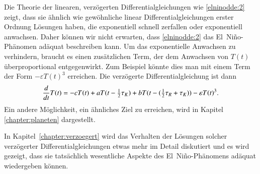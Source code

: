 Die Theorie der linearen, verzögerten Differentialgleichungen wie 
\eqref{elninodde:2} zeigt, dass sie ähnlich wie gewöhnliche linear
Differentialgleichungen erster Ordnung Lösungen haben, die exponentiell
schnell zerfallen oder exponentiell anwachsen.
Daher können wir nicht erwarten, dass \eqref{elninodde:2} das El~Niño-Phänomen
adäquat beschreiben kann.
Um das exponentielle Anwachsen zu verhindern, braucht es einen zusätzlichen
Term, der dem Anwachsen von $T(t)$ überproportional entgegenwirkt.
Zum Beispiel könnte dies man mit einem Term der Form $-\varepsilon T(t)^3$
erreichen.
Die verzögerte Differentialgleichung ist dann
\begin{equation}
\frac{d}{dt}T(t)
=
-cT(t) + aT(t-\halb\tau_K) + bT(t-(\halb\tau_R+\tau_K))
-\varepsilon T(t)^3.
\label{elninodde:3}
\end{equation}
Ein andere Möglichkeit, ein ähnliches Ziel zu erreichen, wird in Kapitel
\ref{chapter:planeten} dargestellt.

In Kapitel~\ref{chapter:verzoegert} wird das Verhalten der Lösungen
solcher verzögerter Differentialgleichungen etwas mehr im Detail
diskutiert und es wird gezeigt, dass sie tatsächlich wesentliche
Aspekte des El~Niño-Phänomens adäquat wiedergeben können.







